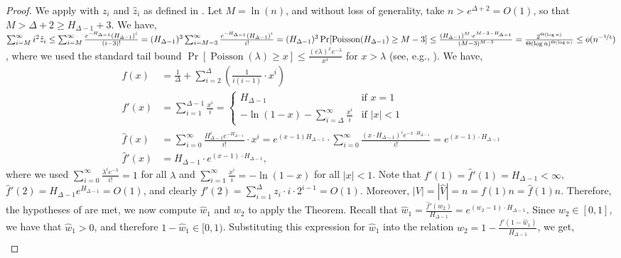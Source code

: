 \documentclass[11pt]{article}
\DeclareMathOperator*{\Poisson}{Poisson}
\begin{document}
\begin{proof}
We apply  with $z_i$ and $\hat{z}_i$ as defined in . Let $M=\ln(n)$, and without loss of generality, take $n>e^{\Delta+2}=O(1)$, so that $M>\Delta+2\ge H_{\Delta-1}+3$. We have, $\sum_{i=M}^\infty i^2 \hat{z}_i \leq \sum_{i=M}^{\infty} \frac{e^{-H_{\Delta-1}}(H_{\Delta-1})^{i}}{(i-3)!} = (H_{\Delta-1})^3\sum_{i=M-3}^{\infty} \frac{e^{-H_{\Delta-1}}(H_{\Delta-1})^{i}}{i!} = (H_{\Delta-1})^3 \Pr[\Poisson(H_{\Delta-1})\geq M - 3] \leq \frac{(H_{\Delta-1})^{M} \cdot e^{M-3-H_{\Delta-1}}}{(M-3)^{M-3}}  = \frac{2^{\Theta(\log n)}}{\Theta(\log n)^{\Theta(\log n)}} \leq o(n^{-\nicefrac15})$, where we used the standard tail bound $\Pr[\Poisson(\lambda)\geq x] \leq \frac{(e\lambda)^x e^{-\lambda}}{x^x}$ for $x>\lambda$ (see, e.g., \cite[Theorem 5.4]{mu05}).
We have,
\begin{align*}
    f(x) & = \frac{1}{\Delta} + \sum_{i=2}^\Delta \left(\frac{1}{i(i-1)}\cdot x^i\right)\\
    f'(x) &=\sum_{i=1}^{\Delta-1}\frac{x^i}{i} = \begin{cases}
    H_{\Delta-1} & \text{if } x=1\\
    -\ln(1-x) - \sum_{i=\Delta}^\infty \frac{x^i}{i} & \text{if } |x|<1
    \end{cases}\\
    \hat{f}(x)&= \sum_{i=0}^\infty \frac{H^i_{\Delta-1 }e^{-H_{\Delta-1}}}{i!} \cdot x^i = e^{(x-1)H_{\Delta-1}}\cdot \sum_{i=0}^\infty \frac{(x \cdot H_{\Delta-1})^i e^{-x\cdot H_{\Delta-1}}}{i!} = e^{(x-1)\cdot H_{\Delta-1}} \\
    \hat{f}'(x)&= H_{\Delta-1} \cdot e^{(x-1)\cdot H_{\Delta-1}},
\end{align*}
where we used $\sum_{i=0}^\infty \frac{\lambda^i e^{-\lambda}}{i!} = 1$ for all $\lambda$ and $\sum_{i=1}^\infty \frac{x^i}{i} = -\ln(1-x)$ for all $|x|<1$. Note that $f'(1)=\hat{f}'(1)=H_{\Delta-1} < \infty$, $\hat{f}'(2) = H_{\Delta-1} e^{H_{\Delta-1}} = O(1)$, and clearly $f'(2)=\sum_{i=1}^\Delta z_i \cdot i \cdot 2^{i-1} = O(1)$. Moreover, $|V|=|\hat{V}|=n=f(1)n=\hat{f}(1)n$. Therefore, the hypotheses of  are met, we now compute $\hat{w}_1$ and $w_2$ to apply the Theorem. Recall that $\hat{w}_1 = \frac{\hat{f}'(w_2)}{H_{\Delta-1}} = e^{(w_2-1) \cdot H_{\Delta-1}}$. Since $w_2\in[0,1]$, we have that $\hat{w}_1 > 0$, and therefore $1 - \hat{w}_1 \in [0,1)$. Substituting this expression for $\hat{w}_1$ into the relation $w_2=1-\frac{f'(1-\hat{w}_1)}{H_{\Delta-1}}$, we get,
\begin{align*}

\end{align*}
\end{proof}
\end{document}
